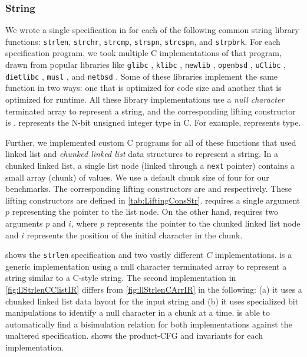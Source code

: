 \subsubsection{String}
We wrote a single specification in \SpecL{} for each of the
following common string library functions: {\tt strlen}, {\tt strchr}, {\tt strcmp}, {\tt strspn},
{\tt strcspn}, and {\tt strpbrk}.  For each specification
program, we took multiple C implementations of that program, drawn from popular
libraries like {\tt glibc} \cite{glibc}, {\tt klibc} \cite{klibc}, {\tt newlib} \cite{newlib},
{\tt openbsd} \cite{openbsdlibc}, {\tt uClibc} \cite{uclibc},
{\tt dietlibc} \cite{dietlibc}, {\tt musl} \cite{musl}, and {\tt netbsd} \cite{netbsd}.
Some of these libraries implement the same function in two ways: one that is optimized
for code size and another that is optimized for runtime.
All these library implementations use a {\em null character} terminated array to represent
a string, and the
corresponding lifting constructor is .
 represents the N-bit unsigned integer type in C.
For example,  represents  type.

Further, we implemented
custom C programs for all of these functions that used
linked list
and {\em chunked linked list} data structures
to represent a string.
In a chunked linked list, a single list node (linked
through a {\tt next} pointer)
contains a small array (chunk) of values.
We use a default chunk size of four for our
benchmarks.
The corresponding lifting constructors are 
and  respectively.
These lifting constructors are defined in \cref{tab:LiftingConsStr}.
 requires a single
argument $p$ representing the pointer to the list node.
On the other hand,  requires two arguments $p$
and $i$, where $p$ represents the pointer to the chunked linked list node
and $i$ represents the position of the initial character in the chunk.

 shows the {\tt strlen} specification and two vastly
different $C$ implementations.  is a generic implementation
using a null character terminated array to represent a string similar to a C-style string.
The second implementation in \cref{fig:llStrlenCClistIR} differs from \cref{fig:llStrlenCArrIR}
in the following: (a) it uses a chunked linked list data layout for the input string
and (b) it uses specialized bit manipulations to identify a null character in a chunk at a time.
\toolName{} is able to automatically find a bisimulation relation
for both implementations against the unaltered specification.
 shows the product-CFG and invariants for each implementation.

